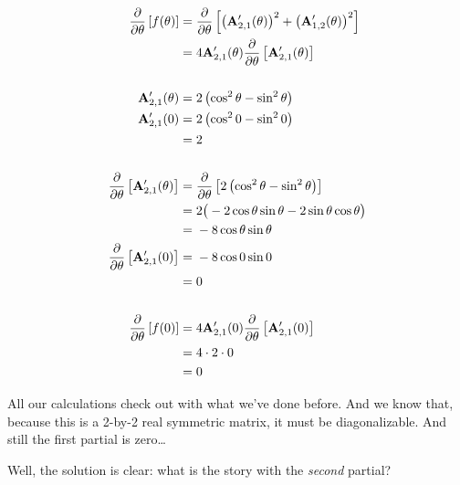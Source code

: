 \documentclass[11pt, oneside]{amsart}
\begin{document}
\begin{equation*}
  \begin{split}
      \frac{\partial }{\partial \theta} \left[f(\theta)\right]
    ={}&
      \frac{\partial }{\partial \theta} \left[
        \left( \mathbf{A}'_{2, 1}(\theta) \right)^2
        + \left( \mathbf{A}'_{1, 2}(\theta) \right)^2
      \right]
    \\
    ={}&
      4
      \mathbf{A}'_{2, 1}(\theta)
      \frac{\partial }{\partial \theta} \left[ \mathbf{A}'_{2, 1}(\theta) \right] \\
    \\
      \mathbf{A}'_{2, 1}(\theta)
    ={}&
      2 \left( \cos^2\theta - \sin^2\theta \right) \\
      \mathbf{A}'_{2, 1}(0)
    ={}&
        2 \left( \cos^2 0 - \sin^2 0 \right) \\
    ={}&
      2 \\
    \\
      \frac{\partial }{\partial \theta} \left[ \mathbf{A}'_{2, 1}(\theta) \right]
    ={}&
      \frac{\partial }{\partial \theta} \left[
        2 \left( \cos^2\theta - \sin^2\theta \right)
      \right] \\
    ={}&
      2 \big( -2\cos\theta \sin\theta - 2\sin\theta\cos\theta \big) \\
    ={}&
      -8 \cos\theta \sin\theta \\
      \frac{\partial }{\partial \theta} \left[ \mathbf{A}'_{2, 1}(0) \right]
    ={}&
      -8 \cos 0 \sin 0 \\
    ={}&
      0 \\
    \\
      \frac{\partial }{\partial \theta} \left[f(0)\right]
    ={}&
      4
      \mathbf{A}'_{2, 1}(0)
      \frac{\partial }{\partial \theta} \left[ \mathbf{A}'_{2, 1}(0) \right] \\
    ={}&
      4 \cdot 2 \cdot 0 \\
    ={}& 0
  \end{split}
\end{equation*}

All our calculations check out with what we've done before. And we know
that, because this is a 2-by-2 real symmetric matrix, it must be
diagonalizable. And still the first partial is zero\dots

Well, the solution is clear: what is the story with the \textit{second}
partial?
\end{document}
